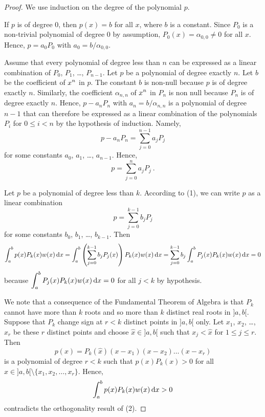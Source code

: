 \begin{proof}
 We use induction on the degree of the polynomial $p$.

If $p$ is of degree $0$, then $p(x) = b$ for all $x$, where
$b$ is a constant.  Since $P_0$ is a non-trivial polynomial of
degree $0$ by assumption, $P_0(x) = \alpha_{0,0} \neq 0$ for all $x$.
Hence, $p = a_0 P_0$ with $a_0 = b/\alpha_{0,0}$.

Assume that every polynomial of degree less than $n$ can be expressed
as a linear combination of $P_0$, $P_1$, \ldots, $P_{n-1}$.  Let $p$
be a polynomial of degree exactly $n$.  Let $b$ be the coefficient
of $\displaystyle x^n$ in $p$.  The constant $b$ is non-null because $p$ is of
degree exactly $n$.  Similarly, the coefficient $\alpha_{n,n}$ of
$\displaystyle x^n$ in $P_n$ is non null because $P_n$ is of degree
exactly $n$.  Hence, $p - a_n P_n$ with $a_n = b/\alpha_{n,n}$ is a
polynomial of degree $n-1$ that can therefore be expressed as a linear
combination of the polynomials $P_i$ for $0\leq i < n$ by the
hypothesis of induction.  Namely,
\[
p - a_n P_n = \sum_{j=0}^{n-1} a_j P_j
\]
for some constants $a_0$, $a_1$, \ldots, $a_{n-1}$.  Hence,
\[
p= \sum_{j=0}^n a_j P_j \ .
\]

 Let $p$ be a polynomial of degree
less than $k$.  According to (1), we can write $p$ as a linear combination
\[
p = \sum_{j=0}^{k-1}b_j P_j
\]
for some constants $b_0$, $b_1$, \ldots, $b_{k-1}$.  Then
\[
\int_a^b p(x)P_k(x) w(x)\,\mathrm{d}x
= \int_a^b \left(\sum_{j=0}^{k-1}b_j P_j(x)\right) P_k(x) w(x)\,\mathrm{d}x
= \sum_{j=0}^{k-1} b_j  \int_a^b P_j(x) P_k(x) w(x)\,\mathrm{d}x = 0
\]
because $\displaystyle \int_a^b P_j(x) P_k(x) w(x)\,\mathrm{d}x =0$ for
all $j<k$ by hypothesis.

 We note that a consequence of the
Fundamental Theorem of Algebra is that $P_k$ cannot have more than
$k$ roots and so more than $k$ distinct real roots in $]a,b[$.
Suppose that $P_k$ change sign at $r < k$ distinct points in $]a,b[$
only.  Let $x_1$, $x_2$, \ldots, $x_r$ be these $r$ distinct points
and choose $\hat{x} \in ]a,b[$ such that $x_j< \hat{x}$ for
$1\leq j \leq r$.   Then
\[
p(x) = P_k(\hat{x})(x-x_1)(x-x_2)\ldots(x-x_r)
\]
is a polynomial of degree $r<k$ such that $p(x)P_k(x)>0$ for all
$x\in]a,b[\setminus \{x_1,x_2,\ldots,x_r\}$.  Hence,
\[
\int_a^b p(x) P_k(x) w(x)\,\mathrm{d}x > 0
\]
contradicts the orthogonality result of (2).


\end{proof}
